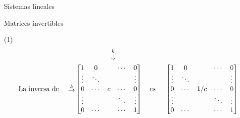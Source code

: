 \begin{chapter}{Sistemas lineales}
\begin{section}{Matrices invertibles}
\begin{ejemplo*}
            (1) 
            \begin{align*}
            &\begin{matrix}
            {}^{}&{}^{}&{}^{}&{}^{}&{}^{}&\overset{k}{\downarrow}&{}^{}&{}^{}&{}^{}
            \end{matrix} \\
            \text{La inversa de \quad}\begin{matrix}
            {}^{}\\
            {}^{}\\
            \overset{k}{\to}\\
            {}^{}\\
            {}^{}
            \end{matrix}
            &\begin{bmatrix}
            1 & 0 &  &\cdots & 0  \\
            \vdots  & \ddots  & & & \vdots \\
            0 & \cdots &c &\cdots &0 \\
            \vdots  &   & &\ddots & \vdots \\
            0  & \cdots  & &\cdots & 1
            \end{bmatrix}
            \text{\quad es \quad}
            \begin{bmatrix}
            1 & 0 &  &\cdots & 0  \\
            \vdots  & \ddots  & & & \vdots \\
            0 & \cdots &1/c &\cdots &0 \\
            \vdots  &   & &\ddots & \vdots \\
            0  & \cdots  & &\cdots & 1
            \end{bmatrix}
            \end{align*}
            

\end{ejemplo*}
\end{section}
\end{chapter}

